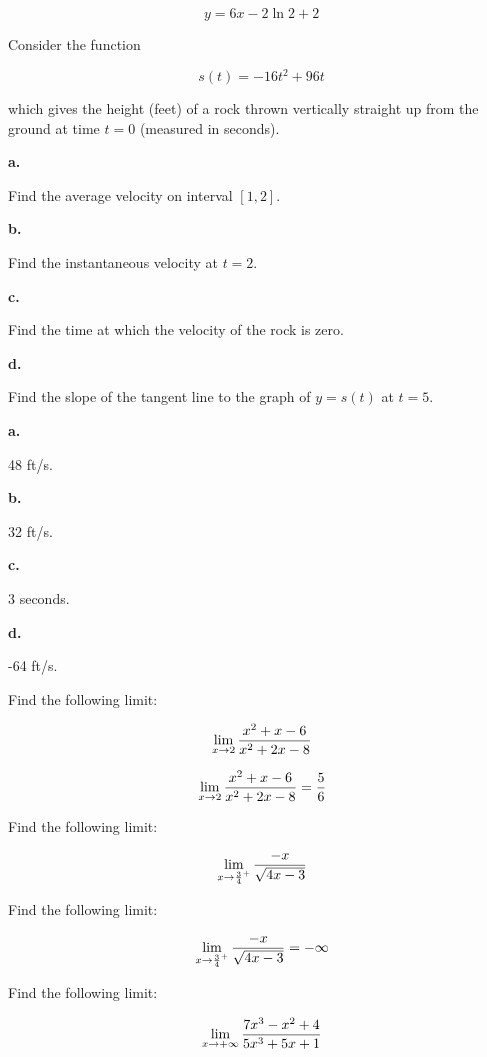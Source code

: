 $$\
y = 6x - 2\ln 2 + 2
$$
\bigskip

Consider the function

$$\
s(t) = -16t^2 + 96t
$$

which gives the height (feet) of a rock thrown vertically
straight up from the ground at time $t = 0$ (measured in seconds).

{\par \bf a.} Find the average velocity on interval $[1, 2]$.

{\par \bf b.} Find the instantaneous velocity at $t = 2$.

{\par \bf c.} Find the time at which the velocity of the rock
is zero.

{\par \bf d.} Find the slope of the tangent line to the graph
of $y = s(t)$ at $t = 5$.
\bigskip

{\par \bf a.} 48 ft/s.

{\par \bf b.} 32 ft/s.

{\par \bf c.} 3 seconds.

{\par \bf d.} -64 ft/s.
\bigskip

Find the following limit:

$$\
\lim_{x \to 2} {
x^2 + x - 6
\over
x^2 + 2x - 8
}
$$

\bigskip

$$\
\lim_{x \to 2} {
x^2 + x - 6
\over
x^2 + 2x - 8
} = {5 \over 6}
$$

\bigskip

Find the following limit:

$$\
\lim_{x \to {3 \over 4}^+} {
-x
\over
\sqrt{4x - 3}
}
$$

\bigskip

Find the following limit:

$$\
\lim_{x \to {3 \over 4}^+} {
-x
\over
\sqrt{4x - 3}
} = -\infty
$$

\bigskip

Find the following limit:

$$\
\lim_{x \to +\infty} {
7x^3 - x^2 + 4
\over
5x^3 + 5x + 1
}
$$

\bigskip

